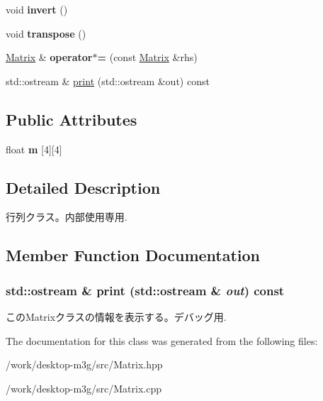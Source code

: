 \begin{CompactItemize}
\item 
\hypertarget{classm3g_1_1Matrix_7fa1616cc61c19a5efcc863c950f7f30}{
void \textbf{invert} ()}
\label{classm3g_1_1Matrix_7fa1616cc61c19a5efcc863c950f7f30}

\item 
\hypertarget{classm3g_1_1Matrix_f3a99ffb20127be48232d12260e934dc}{
void \textbf{transpose} ()}
\label{classm3g_1_1Matrix_f3a99ffb20127be48232d12260e934dc}

\item 
\hypertarget{classm3g_1_1Matrix_5d28596666a27f88d74bacceaef9b326}{
\hyperlink{classm3g_1_1Matrix}{Matrix} \& \textbf{operator$\ast$=} (const \hyperlink{classm3g_1_1Matrix}{Matrix} \&rhs)}
\label{classm3g_1_1Matrix_5d28596666a27f88d74bacceaef9b326}

\item 
std::ostream \& \hyperlink{classm3g_1_1Matrix_6fea17fa1532df3794f8cb39cb4f911f}{print} (std::ostream \&out) const 
\end{CompactItemize}
\subsection*{Public Attributes}
\begin{CompactItemize}
\item 
\hypertarget{classm3g_1_1Matrix_7cdab8754cd800b1ba4008e559aa314c}{
float \textbf{m} \mbox{[}4\mbox{]}\mbox{[}4\mbox{]}}
\label{classm3g_1_1Matrix_7cdab8754cd800b1ba4008e559aa314c}

\end{CompactItemize}


\subsection{Detailed Description}
行列クラス。内部使用専用. 

\subsection{Member Function Documentation}
\hypertarget{classm3g_1_1Matrix_6fea17fa1532df3794f8cb39cb4f911f}{
\subsubsection[{print}]{\setlength{\rightskip}{0pt plus 5cm}std::ostream \& print (std::ostream \& {\em out}) const}}
\label{classm3g_1_1Matrix_6fea17fa1532df3794f8cb39cb4f911f}


このMatrixクラスの情報を表示する。デバッグ用. 

The documentation for this class was generated from the following files:\begin{CompactItemize}
\item 
/work/desktop-m3g/src/Matrix.hpp\item 
/work/desktop-m3g/src/Matrix.cpp\end{CompactItemize}
